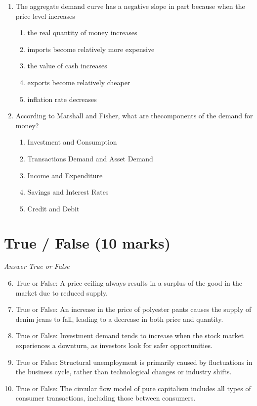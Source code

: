 \documentclass[12pt]{article}
\begin{document}
\begin{enumerate}[label=\arabic*.]
\begin{enumerate}[label=(\alph*)]
    \item A bumper crop of oranges in Florida
\end{enumerate}
\item The aggregate demand curve has a negative slope in part because when the price level increases
\begin{enumerate}[label=(\alph*)]
    \item the real quantity of money increases
    \item imports become relatively more expensive
    \item the value of cash increases
    \item exports become relatively cheaper
    \item inflation rate decreases
\end{enumerate}
\item According to Marshall and Fisher, what are thecomponents of the demand for money?
\begin{enumerate}[label=(\alph*)]
    \item Investment and Consumption
    \item Transactions Demand and Asset Demand
    \item Income and Expenditure
    \item Savings and Interest Rates
    \item Credit and Debit
\end{enumerate}
\end{enumerate}

\section*{True / False (10 marks)}
\textit{Answer True or False}
\begin{enumerate}[label=\arabic*.]
\setcounter{enumi}{5}
\item True or False: A price ceiling always results in a surplus of the good in the market due to reduced supply.
\item True or False: An increase in the price of polyester pants causes the supply of denim jeans to fall, leading to a decrease in both price and quantity.
\item True or False: Investment demand tends to increase when the stock market experiences a downturn, as investors look for safer opportunities.
\item True or False: Structural unemployment is primarily caused by fluctuations in the business cycle, rather than technological changes or industry shifts.
\item True or False: The circular flow model of pure capitalism includes all types of consumer transactions, including those between consumers.
\end{enumerate}
\end{document}
